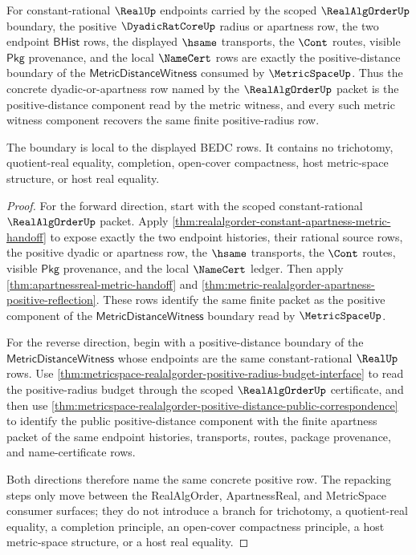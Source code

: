 \begin{theorem}
\label{thm:metric-realalgorder-positive-radius-distance-boundary}
For constant-rational $\RealUp$ endpoints carried by the scoped
$\RealAlgOrderUp$ boundary, the positive $\DyadicRatCoreUp$ radius or apartness
row, the two endpoint $\mathsf{BHist}$ rows, the displayed $\hsame$ transports,
the $\Cont$ routes, visible $\mathsf{Pkg}$ provenance, and the local
$\NameCert$ rows are exactly the positive-distance boundary of the
$\mathsf{MetricDistanceWitness}$ consumed by $\MetricSpaceUp$. Thus the concrete
dyadic-or-apartness row named by the $\RealAlgOrderUp$ packet is the
positive-distance component read by the metric witness, and every such metric
witness component recovers the same finite positive-radius row.

The boundary is local to the displayed BEDC rows. It contains no trichotomy,
quotient-real equality, completion, open-cover compactness, host metric-space
structure, or host real equality.
\end{theorem}
\begin{proof}
For the forward direction, start with the scoped constant-rational
$\RealAlgOrderUp$ packet. Apply
\autoref{thm:realalgorder-constant-apartness-metric-handoff} to expose exactly
the two endpoint histories, their rational source rows, the positive dyadic or
apartness row, the $\hsame$ transports, the $\Cont$ routes, visible
$\mathsf{Pkg}$ provenance, and the local $\NameCert$ ledger. Then apply
\autoref{thm:apartnessreal-metric-handoff} and
\autoref{thm:metric-realalgorder-apartness-positive-reflection}. These rows
identify the same finite packet as the positive component of the
$\mathsf{MetricDistanceWitness}$ boundary read by $\MetricSpaceUp$.

For the reverse direction, begin with a positive-distance boundary of the
$\mathsf{MetricDistanceWitness}$ whose endpoints are the same
constant-rational $\RealUp$ rows. Use
\autoref{thm:metricspace-realalgorder-positive-radius-budget-interface} to read
the positive-radius budget through the scoped $\RealAlgOrderUp$ certificate,
and then use
\autoref{thm:metricspace-realalgorder-positive-distance-public-correspondence}
to identify the public positive-distance component with the finite apartness
packet of the same endpoint histories, transports, routes, package provenance,
and name-certificate rows.

Both directions therefore name the same concrete positive row. The repacking
steps only move between the RealAlgOrder, ApartnessReal, and MetricSpace
consumer surfaces; they do not introduce a branch for trichotomy, a
quotient-real equality, a completion principle, an open-cover compactness
principle, a host metric-space structure, or a host real equality.
\end{proof}

